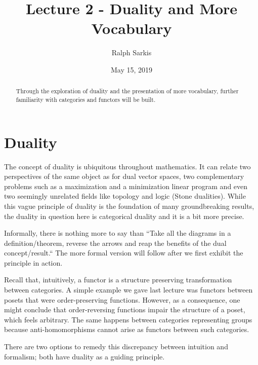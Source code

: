 \documentclass{article}
\title{Lecture 2 - Duality and More Vocabulary\vspace{-10pt}}
\author{Ralph Sarkis}
\date{\vspace{-10pt}May 15, 2019\vspace{-15pt}}  %
\theoremstyle{definition}
\theoremstyle{remark}
\begin{document}
\maketitle
\begin{abstract} Through the exploration of duality and the presentation of more vocabulary, further familiarity with categories and functors will be built.
\end{abstract}
\section{Duality}
The concept of duality is ubiquitous throughout mathematics. It can relate two perspectives of the same object as for dual vector spaces, two complementary problems such as a maximization and a minimization linear program and even two seemingly unrelated fields like topology and logic (Stone dualities). While this vague principle of duality is the foundation of many groundbreaking results, the duality in question here is categorical duality and it is a bit more precise.

Informally, there is nothing more to say than ``Take all the diagrams in a definition/theorem, reverse the arrows and reap the benefits of the dual concept/result.`` The more formal version will follow after we first exhibit the principle in action.

Recall that, intuitively, a functor is a structure preserving transformation between categories. A simple example we gave last lecture was functors between posets that were order-preserving functions. However, as a consequence, one might conclude that order-reversing functions impair the structure of a poset, which feels arbitrary. The same happens between categories representing groups because anti-homomorphisms cannot arise as functors between such categories.

There are two options to remedy this discrepancy between intuition and formalism; both have duality as a guiding principle.
\end{document}
